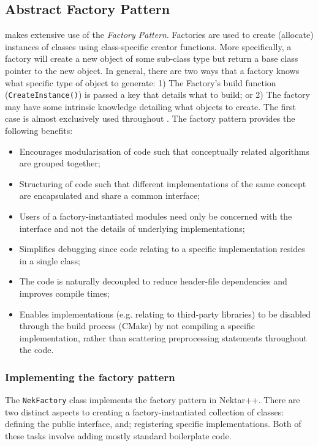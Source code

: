 \subsection{Abstract Factory Pattern}

{\nek} makes extensive use of the \emph{Factory Pattern}.
Factories are used to create (allocate) instances of classes using class-specific creator functions. More
specifically, a factory will create a new object of some
sub-class type but return a base class pointer to the new
object. In general, there are two ways that a factory knows what
specific type of object to generate: 1) The Factory's build
function (\lstinline{CreateInstance()}) is
passed a key that details what to build; or 2) The factory may
have some intrinsic knowledge detailing what objects to create. The first case is almost exclusively used throughout {\nek}.
The factory pattern provides the following benefits:
\begin{itemize}
\item Encourages modularisation of code such that conceptually related
algorithms are grouped together;
\item Structuring of code such that different implementations of the same
concept are encapsulated and share a common interface;
\item Users of a factory-instantiated modules need only be concerned with the
 interface and not the details of underlying implementations;
\item Simplifies debugging since code relating to a specific implementation
 resides in a single class;
\item The code is naturally decoupled to reduce header-file dependencies and
 improves compile times;
\item Enables implementations (e.g. relating to third-party libraries) to be
 disabled through the build process (CMake) by not compiling a specific 
 implementation, rather than scattering preprocessing statements throughout the
 code.
\end{itemize}


\subsubsection{Implementing the factory pattern}
The \lstinline{NekFactory} class implements the factory pattern in Nektar++.
There are two distinct aspects to creating a factory-instantiated collection of
classes: defining the public interface, and; registering specific
implementations. Both of these tasks involve adding mostly standard boilerplate code.

